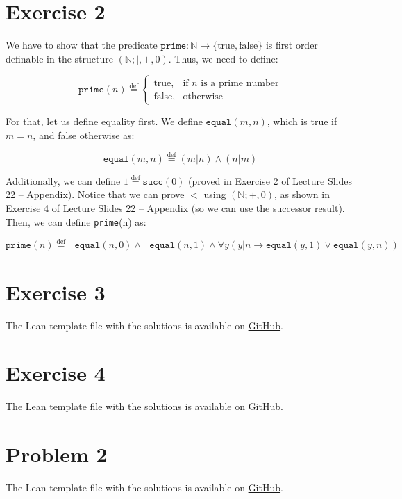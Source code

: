 \documentclass[11pt]{article}
\begin{document}

\section*{Exercise 2}

We have to show that the predicate $\texttt{prime}: \mathbb{N} \to \{\text{true}, \text{false}\}$ is first order definable in the structure $(\mathbb{N}; |, +, 0)$. Thus, we need to define:

\begin{equation*}
    \texttt{prime}(n) \stackrel{\text{def}}{=} 
    \begin{cases}
        \text{true,} & \text{if } n \text{ is a prime number} \\
        \text{false,} & \text{otherwise}
    \end{cases}
\end{equation*}

For that, let us define equality first. We define $\texttt{equal}(m, n)$, which is true if $m = n$, and false otherwise as:

$$\texttt{equal}(m, n) \stackrel{\text{def}}{=} (m | n) \land (n | m)$$

Additionally, we can define $1 \stackrel{\text{def}}{=} \texttt{succ}(0)$ (proved in Exercise 2 of Lecture Slides 22 -- Appendix). Notice that we can prove $<$ using $(\mathbb{N}; +, 0)$, as shown in Exercise 4 of  Lecture Slides 22 -- Appendix (so we can use the successor result). Then, we can define \texttt{prime}(n) as:

$$\texttt{prime}(n)\stackrel{\text{def}}{=} \lnot \texttt{equal}(n, 0)\land \lnot \texttt{equal}(n, 1) \land \forall y (y | n \to \texttt{equal}(y, 1) \lor \texttt{equal}(y, n))$$


\section*{Exercise 3}
The Lean template file with the solutions is available on \href{https://github.com/lucastassis/BU-CS511/blob/main/HW06/code/HW06.lean}{GitHub}.

\section*{Exercise 4}
The Lean template file with the solutions is available on \href{https://github.com/lucastassis/BU-CS511/blob/main/HW06/code/HW06.lean}{GitHub}.

\section*{Problem 2}
The Lean template file with the solutions is available on \href{https://github.com/lucastassis/BU-CS511/blob/main/HW06/code/HW06.lean}{GitHub}.
\end{document}
